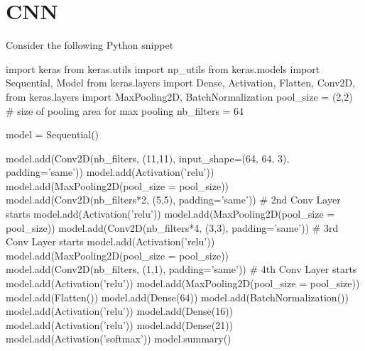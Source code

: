 
\section{CNN}

Consider the following Python snippet
\begin{python}
import keras
from keras.utils import np_utils
from keras.models import Sequential, Model
from keras.layers import Dense, Activation, Flatten, Conv2D,
from keras.layers import MaxPooling2D, BatchNormalization
pool_size = (2,2) # size of pooling area for max pooling
nb_filters = 64

model = Sequential()

model.add(Conv2D(nb_filters, (11,11), input_shape=(64, 64, 3), padding='same'))
model.add(Activation('relu'))
model.add(MaxPooling2D(pool_size = pool_size))
model.add(Conv2D(nb_filters*2, (5,5), padding='same')) # 2nd Conv Layer starts
model.add(Activation('relu'))
model.add(MaxPooling2D(pool_size = pool_size))
model.add(Conv2D(nb_filters*4, (3,3), padding='same')) # 3rd Conv Layer starts
model.add(Activation('relu'))
model.add(MaxPooling2D(pool_size = pool_size))
model.add(Conv2D(nb_filters, (1,1), padding='same'))   # 4th Conv Layer starts
model.add(Activation('relu'))
model.add(MaxPooling2D(pool_size = pool_size))
model.add(Flatten())
model.add(Dense(64))
model.add(BatchNormalization())
model.add(Activation('relu'))
model.add(Dense(16))
model.add(Activation('relu'))
model.add(Dense(21))
model.add(Activation('softmax'))
model.summary()
\end{python}




